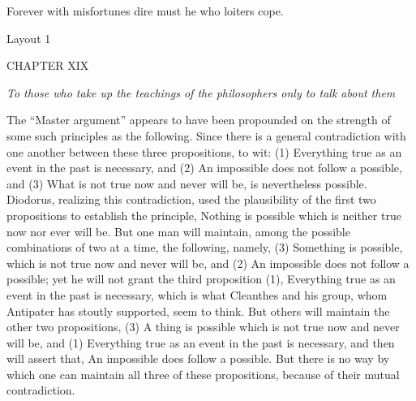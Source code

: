 Forever with misfortunes dire must he who loiters cope.



Layout 1

CHAPTER XIX

\emph{To those who take up the teachings of the philosophers only to talk about them}

The ``Master argument'' appears to have been propounded on the strength of some such principles as the following. Since there is a general contradiction with one another between these three propositions, to wit: (1) Everything true as an event in the past is necessary, and (2) An impossible does not follow a possible, and (3) What is not true now and never will be, is nevertheless possible. Diodorus, realizing this contradiction, used the plausibility of the first two propositions to establish the principle, Nothing is possible which is neither true now nor ever will be. But one man will maintain, among the possible combinations of two at a time, the following, namely, (3) Something is possible, which is not true now and never will be, and (2) An impossible does not follow a possible; yet he will not grant the third proposition (1), Everything true as an event in the past is necessary, which is what Cleanthes and his group, whom Antipater has stoutly supported, seem to think. But others will maintain the other two propositions, (3) A thing is possible which is not true now and never will be, and (1) Everything true as an event in the past is necessary, and then will assert that, An impossible does follow a possible. But there is no way by which one can maintain all three of these propositions, because of their mutual contradiction.

